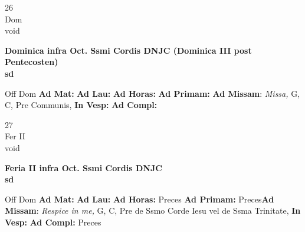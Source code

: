 \documentclass[10pt, openany]{book}
\begin{document}
    \begin{center}
        \begin{minipage}{3.5in}
            \vspace{2em}
            \begin{minipage}{0.5in}
                {\Huge 26} \\
                {\normalsize Dom} \\
                {\normalsize void}
            \end{minipage}
            \begin{minipage}{3.0in}
                \textbf{ \large Dominica infra Oct. Ssmi Cordis DNJC (Dominica III post Pentecosten) \\
                \textnormal{\normalsize sd}} \\ 
            \end{minipage}
            \begin{justify}Off Dom
                \textbf{Ad Mat: }
                \textbf{Ad Lau: }
                \textbf{Ad Horas: }
                \textbf{Ad Primam: }\textbf{Ad Missam}: \textit{Missa,} G, C, Pre Communis,  
                \textbf{In Vesp: }
                \textbf{Ad Compl: }
            \end{justify}
        \end{minipage}
    \end{center}

    \begin{center}
        \begin{minipage}{3.5in}
            \vspace{2em}
            \begin{minipage}{0.5in}
                {\Huge 27} \\
                {\normalsize Fer II} \\
                {\normalsize void}
            \end{minipage}
            \begin{minipage}{3.0in}
                \textbf{ \large Feria II infra Oct. Ssmi Cordis DNJC \\
                \textnormal{\normalsize sd}} \\ 
            \end{minipage}
            \begin{justify}Off Dom
                \textbf{Ad Mat: }
                \textbf{Ad Lau: }
                \textbf{Ad Horas: }Preces
                \textbf{Ad Primam: }Preces\textbf{Ad Missam}: \textit{Respice in me,} G, C, Pre de Ssmo Corde Iesu vel de Ssma Trinitate,  
                \textbf{In Vesp: }
                \textbf{Ad Compl: }Preces
            \end{justify}
        \end{minipage}
    \end{center}
\end{document}
